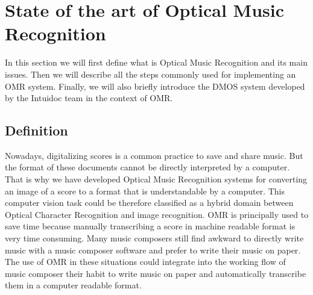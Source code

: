 \documentclass[11pt]{sdm}
\begin{document}
\section{State of the art of Optical Music Recognition} \label{sec:soa_OMR}

In this section we will first define what is Optical Music Recognition and its main issues.
Then we will describe all the steps commonly used for implementing an OMR system.
Finally, we will also briefly introduce the DMOS system developed by the Intuidoc team in the context of OMR.

\subsection{Definition}

Nowadays, digitalizing scores is a common practice to save and share music.
But the format of these documents cannot be directly interpreted by a computer.
That is why we have developed Optical Music Recognition systems for converting an image of a score to a format that is understandable by a computer.
This computer vision task could be therefore classified as a hybrid domain between Optical Character Recognition and image recognition.
OMR is principally used to save time because manually transcribing a score in machine readable format is very time consuming.
Many music composers still find awkward to directly write music with a music composer software and prefer to write their music on paper.
The use of OMR in these situations could integrate into the working flow of music composer their habit to write music on paper and automatically transcribe them in a computer readable format.
\end{document}
